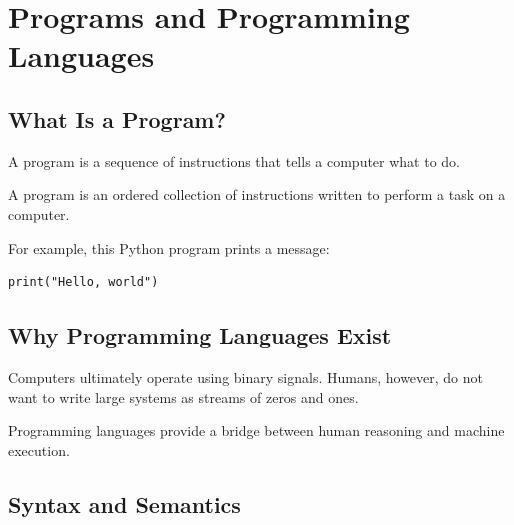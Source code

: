 \chapter{Programs and Programming Languages}
\label{chap:programs-and-programming-languages}



\section{What Is a Program?}

A program is a sequence of instructions that tells a computer what to do.

\begin{definition}
A program is an ordered collection of instructions written to perform a task on a computer.
\end{definition}

For example, this Python program prints a message:

\begin{lstlisting}
print("Hello, world")
\end{lstlisting}

\section{Why Programming Languages Exist}

Computers ultimately operate using binary signals. Humans, however, do not want to write large systems as streams of zeros and ones.

Programming languages provide a bridge between human reasoning and machine execution.

\section{Syntax and Semantics}

